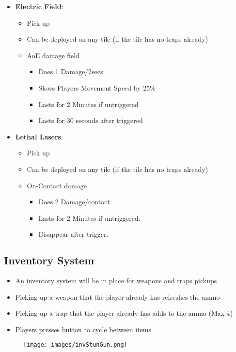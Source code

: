 \documentclass[10pt]{report}
\begin{document}
\begin{itemize}
    \item \textbf{Electric Field}:
    \begin{itemize}
        \item Pick up
        \item Can be deployed on any tile (if the tile has no traps already)
        \item AoE damage field
        \begin{itemize}
            \item Does 1 Damage/2secs
            \item Slows Players Movement Speed by 25\%
            \item Lasts for 2 Minutes if untriggered
            \item Lasts for 30 seconds after triggered
        \end{itemize}
    \end{itemize}
    \item \textbf{Lethal Lasers}:
    \begin{itemize}
        \item Pick up
        \item Can be deployed on any tile (if the tile has no traps already)
        \item On-Contact damage
        \begin{itemize}
            \item Does 2 Damage/contact
            \item Lasts for 2 Minutes if untriggered.
            \item Disappear after trigger.
        \end{itemize}
    \end{itemize}
\end{itemize}

\subsection{Inventory System}

\begin{minipage}{.8\linewidth}
    \begin{itemize}
        \item An inventory system will be in place for weapons and traps pickups
        \item Picking up a weapon that the player already has refreshes the ammo
        \item Picking up a trap that the player already has adds to the ammo (Max 4)
        \item Players presses button to cycle between items    
    \end{itemize}
\end{minipage}\hfill
\begin{minipage}{.18\linewidth}
    \begin{figure}[H]
        \texttt{[image: images/invStunGun.png]}
        \caption{}
    \end{figure}
\end{minipage}
\end{document}
